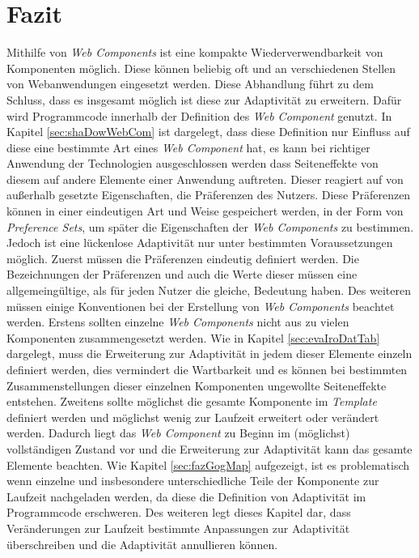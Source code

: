 \documentclass[12pt, paper=a4, bibtotoc, toc=listof, headsepline=true]{scrreprt}
\begin{document}
\chapter{Fazit}
Mithilfe von \emph{Web Components} ist eine kompakte Wiederverwendbarkeit von Komponenten möglich. Diese können beliebig oft und an verschiedenen Stellen von Webanwendungen eingesetzt werden. Diese Abhandlung führt zu dem Schluss, dass es insgesamt möglich ist diese zur Adaptivität zu erweitern. Dafür wird Programmcode innerhalb der Definition des \emph{Web Component} genutzt. In Kapitel \ref{sec:shaDowWebCom} ist dargelegt, dass diese Definition nur Einfluss auf diese eine bestimmte Art eines \emph{Web Component} hat, es kann bei richtiger Anwendung der Technologien ausgeschlossen werden dass Seiteneffekte von diesem auf andere Elemente einer Anwendung auftreten. Dieser reagiert auf von außerhalb gesetzte Eigenschaften, die Präferenzen des Nutzers. Diese Präferenzen können in einer eindeutigen Art und Weise gespeichert werden, in der Form von \emph{Preference Sets}, um später die Eigenschaften der \emph{Web Components} zu bestimmen.
\newline
Jedoch ist eine lückenlose Adaptivität nur unter bestimmten Voraussetzungen möglich. Zuerst müssen die Präferenzen eindeutig definiert werden. Die Bezeichnungen der Präferenzen und auch die Werte dieser müssen eine allgemeingültige, als für jeden Nutzer die gleiche, Bedeutung haben. Des weiteren müssen einige Konventionen bei der Erstellung von \emph{Web Components} beachtet werden. Erstens sollten einzelne \emph{Web Components} nicht aus zu vielen Komponenten zusammengesetzt werden. Wie in Kapitel \ref{sec:evaIroDatTab} dargelegt, muss die Erweiterung zur Adaptivität in jedem dieser Elemente einzeln definiert werden,  dies vermindert die Wartbarkeit und es können bei bestimmten Zusammenstellungen dieser einzelnen Komponenten ungewollte Seiteneffekte entstehen. Zweitens sollte möglichst die gesamte Komponente im \emph{Template} definiert werden und möglichst wenig zur Laufzeit erweitert oder verändert werden. Dadurch liegt das \emph{Web Component} zu Beginn im (möglichst) vollständigen Zustand vor und die Erweiterung zur Adaptivität kann das gesamte Elemente beachten. Wie Kapitel \ref{sec:fazGogMap} aufgezeigt, ist es problematisch wenn einzelne und insbesondere unterschiedliche Teile der Komponente zur Laufzeit nachgeladen werden, da diese die Definition von Adaptivität im Programmcode erschweren. Des weiteren legt dieses Kapitel dar, dass Veränderungen zur Laufzeit bestimmte Anpassungen zur Adaptivität überschreiben und die Adaptivität annullieren können.
\end{document}
